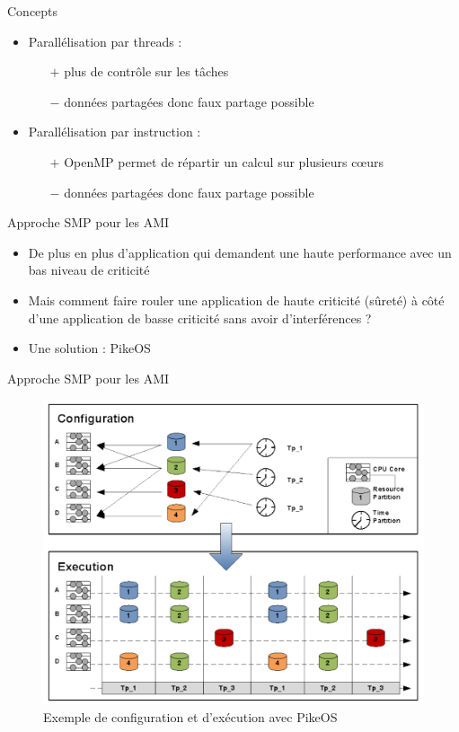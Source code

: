 \documentclass{beamer}
\begin{document}
\begin{frame}{Concepts}
	\begin{itemize}
		\item Parallélisation par threads :
			\begin{itemize}
				\item[$+$] plus de contrôle sur les tâches
				\item[$-$] données partagées donc faux partage possible 
			\end{itemize}
		\item Parallélisation par instruction :
			\begin{itemize}
				\item[$+$] OpenMP permet de répartir un calcul sur plusieurs cœurs
				\item[$-$] données partagées donc faux partage possible 
			\end{itemize}
	\end{itemize}
\end{frame}

\begin{frame}{Approche SMP pour les AMI}
	\begin{itemize}
		\item De plus en plus d'application qui demandent une haute performance avec un
			bas niveau de criticité
		\item Mais comment faire rouler une application de haute criticité (sûreté) à côté
			d'une application de basse criticité sans avoir d'interférences ?
		\item Une solution : PikeOS
	\end{itemize}	
\end{frame}

\begin{frame}{Approche SMP pour les AMI}
	\begin{figure}
		\centering
		\includegraphics[height=0.6\paperheight]{pikeos.png}
		\caption{Exemple de configuration et d'exécution avec PikeOS \cite{Fuch}}
		\label{fig:pikeos}
	\end{figure}
\end{frame}
\end{document}
